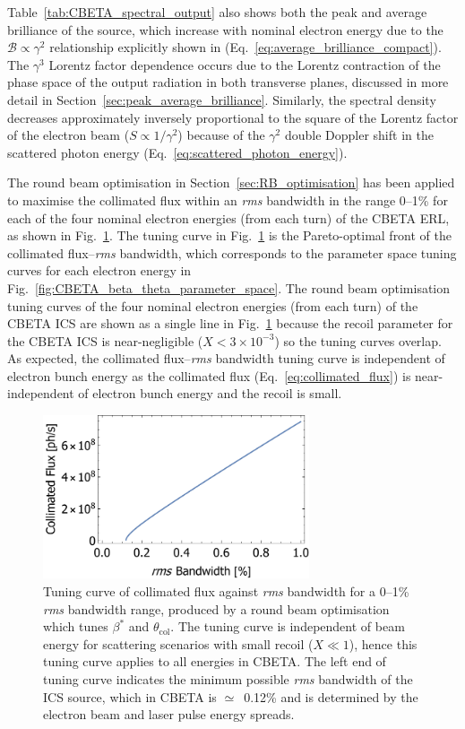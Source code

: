 \documentclass[../main.tex]{subfiles}
\begin{document}
Table~\ref{tab:CBETA_spectral_output} also shows both the peak and average brilliance of the source, which increase with nominal electron energy due to the $\mathcal{B} \propto \gamma^{2}$ relationship  explicitly shown in (Eq.~\ref{eq:average_brilliance_compact}). The $\gamma^{3}$ Lorentz factor dependence occurs due to the Lorentz contraction of the phase space of the output radiation in both transverse planes, discussed in more detail in Section~\ref{sec:peak_average_brilliance}. Similarly, the spectral density decreases approximately inversely proportional to the square of the Lorentz factor of the electron beam ($S \propto 1/\gamma^{2}$) because of the $\gamma^{2}$ double Doppler shift in the scattered photon energy (Eq.~\ref{eq:scattered_photon_energy}). 

The round beam optimisation in Section~\ref{sec:RB_optimisation} has been applied to maximise the collimated flux within an \textit{rms} bandwidth in the range 0--1\% for each of the four nominal electron energies (from each turn) of the CBETA ERL, as shown in Fig.~\ref{fig:CBETA_Tuning_Curve}. The tuning curve in Fig.~\ref{fig:CBETA_Tuning_Curve} is the Pareto-optimal front of the collimated flux--\textit{rms} bandwidth, which corresponds to the parameter space tuning curves for each electron energy in Fig.~\ref{fig:CBETA_beta_theta_parameter_space}. The round beam optimisation tuning curves of the four nominal electron energies (from each turn) of the CBETA ICS are shown as a single line in Fig.~\ref{fig:CBETA_Tuning_Curve} because the recoil parameter for the CBETA ICS is near-negligible ($X<3\times 10^{-3}$) so the tuning curves overlap. As expected, the collimated flux--\textit{rms} bandwidth tuning curve is independent of electron bunch energy as the collimated flux (Eq.~\ref{eq:collimated_flux}) is near-independent of electron bunch energy and the recoil is small. 
\begin{figure}[!h]
\centering
\includegraphics[width=0.7\textwidth]{Figures/CBETA_Inverse_Compton_Source_Design/CBETA150_RB_Fcol_BW.pdf}
\caption{Tuning curve of collimated flux against \textit{rms} bandwidth for a 0--1\% \textit{rms} bandwidth range, produced by a round beam optimisation which tunes $\beta^{*}$ and $\theta_{\mathrm{col}}$. The tuning curve is independent of beam energy for scattering scenarios with small recoil ($X \ll 1$), hence this tuning curve applies to all energies in CBETA. The left end of tuning curve indicates the minimum possible \textit{rms} bandwidth of the ICS source, which in CBETA is $\simeq$~0.12\% and is determined by the electron beam and laser pulse energy spreads.}
\label{fig:CBETA_Tuning_Curve}
\end{figure}
\end{document}
